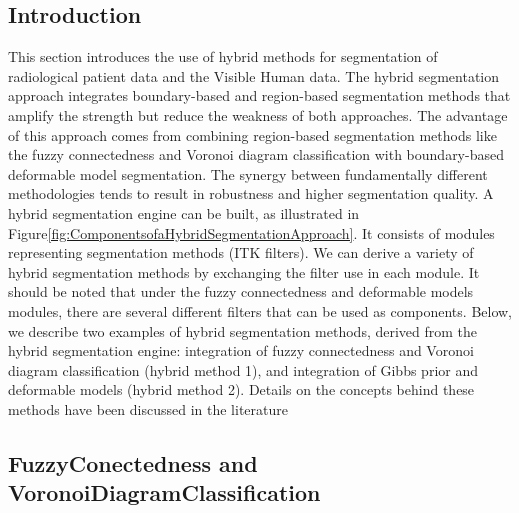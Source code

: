 %
%
% 
%
%
%

\subsection{Introduction}
\label{sec:HybridSegmentationIntroduction}

 
 This section introduces the use of hybrid methods for segmentation
of
 radiological patient data and the Visible Human data. The hybrid
segmentation
 approach integrates boundary-based and region-based
segmentation methods that
 amplify the strength but reduce the
weakness of both approaches. The advantage
 of this approach comes
from combining region-based segmentation methods like
 the fuzzy
connectedness and Voronoi diagram classification with boundary-based
deformable model segmentation. The synergy between fundamentally
different
 methodologies tends to result in robustness and higher
segmentation quality. 
 A hybrid segmentation engine can be built, as
illustrated in
Figure\ref{fig:ComponentsofaHybridSegmentationApproach}. It consists
of modules
 representing segmentation methods (ITK filters). We can
derive a variety of
 hybrid segmentation methods by exchanging the
filter use in each module. It
 should be noted that under the fuzzy
connectedness and deformable models
 modules, there are several
different filters that can be used as components.
 Below, we describe
two examples of hybrid segmentation methods,
 derived from the hybrid
segmentation engine: integration of
 fuzzy connectedness and Voronoi
diagram classification (hybrid method 1), and integration of Gibbs
prior and deformable models (hybrid method 2).  Details on the
concepts
 behind these methods have been discussed in the literature
\cite{Angelini2002,Udupa2002,Jin2002,Imielinska2001,Imielinska2000a,Imielinska2000b}



\subsection{FuzzyConectedness and VoronoiDiagramClassification}
\label{sec:HybridMethod1}

